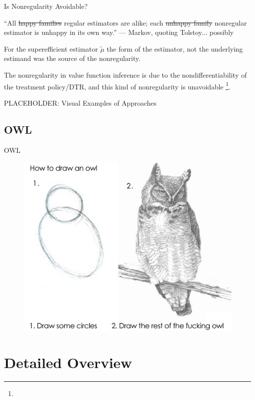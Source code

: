 \documentclass[aspectratio=169, professionalfonts]{beamer}
\begin{document}
\begin{frame}{Is Nonregularity Avoidable?}

	``All \sout{happy families} regular estimators are alike; each \sout{unhappy
		family} nonregular estimator is unhappy in its own way.'' --- Markov,
	quoting Tolstoy\pause... possibly

	\vfill \pause
	For the superefficient estimator $\tilde{\mu}$ the form of the estimator, not
	the underlying estimand was the source of the nonregularity.

	\vfill \pause

	The nonregularity in value function inference is due to the nondifferentiability of the treatment
	policy/DTR, and this kind of nonregularity is unavoidable
	\footnote<4->{}.
	\vfill
\end{frame}


\begin{frame}{PLACEHOLDER: Visual Examples of Approaches}
\end{frame}

\subsection{OWL}
\begin{frame}{OWL}
	\begin{figure}
		\includegraphics[width=.6\textwidth]{figures/how-to-draw-an-owl}
	\end{figure}
\end{frame}

\section{Detailed Overview}
\end{document}
